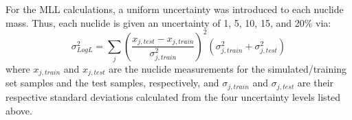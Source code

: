 For the \gls{MLL} calculations, a uniform uncertainty was introduced to each
nuclide mass.  Thus, each nuclide is given an uncertainty of 1, 5, 10, 15, and
20\% via:
\begin{equation}
  \sigma_{Log L}^2 = \sum_j \left( 
                            \frac{x_{j,test} - x_{j,train}}{\sigma_{j,train}^2}
                            \right)^2 
                            (\sigma_{j,train}^2 + \sigma_{j,test}^2)
  \label{eq:mllunc}
\end{equation}
where $x_{j,train}$ and $x_{j,test}$ are the nuclide measurements for the
simulated/training set samples and the test samples, respectively, and
$\sigma_{j,train}$ and $\sigma_{j,test}$ are their respective standard
deviations calculated from the four uncertainty levels listed above.  
